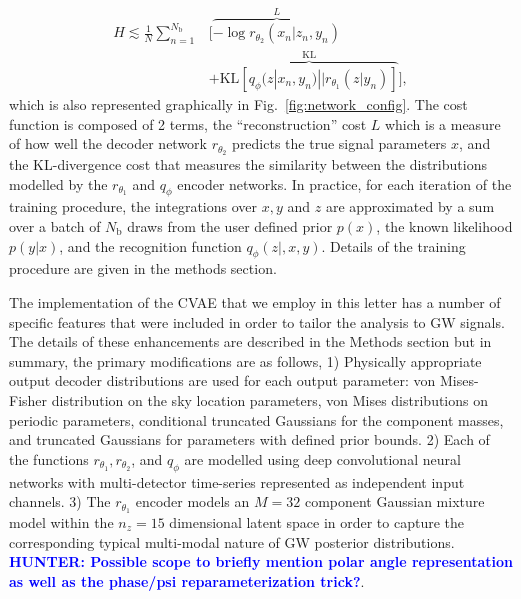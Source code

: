 \documentclass[%
showpacs,
nofootinbib,
 amsmath,amssymb,
 aps,
 twocolumn,
 prl,
 reprint,
floatfix,
]{revtex4-1}
\newcommand{\hunter}[1]{\textbf{\textcolor{blue}{HUNTER: #1}}}
\begin{document}
%
\begin{align}\label{eq:cost3} H \lesssim
\frac{1}{N}\sum_{n=1}^{N_{\text{b}}}&\Big[\overbrace{-\log
r_{\theta_{2}}(x_{n}|z_{n},y_{n})}^{L}\nonumber\\
&+\overbrace{\text{KL}\left[q_{\phi}(z|x_{n},y_{n})||r_{\theta_{1}}(z|y_{n})\right]}^{\text{KL}}\Big],
\end{align}
%
which is also represented graphically in Fig.~\ref{fig:network_config}.
The cost function is composed of 2 terms, the ``reconstruction'' cost $L$ which
is a measure of how well the decoder network $r_{\theta_2}$ predicts the true
signal parameters $x$, and the \ac{KL}-divergence cost that measures the
similarity between the distributions modelled by the $r_{\theta_1}$ and
$q_{\phi}$ encoder networks. In practice, for each iteration of the training
procedure, the integrations over $x,y$ and $z$ are approximated by a sum over a
batch of $N_{\text{b}}$ draws from the user defined prior $p(x)$, the known
likelihood $p(y|x)$, and the recognition function $q_{\phi}(z|,x,y)$. Details
of the training procedure are given in the methods section.  

%
%
The implementation of the \ac{CVAE} that we employ in this letter has a
number of specific features that were included in order to tailor the analysis to
\ac{GW} signals. The details of these enhancements are described in the Methods
section but in summary, the primary modifications are as follows, 1) Physically 
appropriate output decoder distributions are used for each output parameter: 
von Mises-Fisher distribution on the sky location parameters, von Mises 
distributions on periodic parameters, conditional truncated Gaussians for 
the component masses, and truncated Gaussians for
parameters with defined prior bounds. 2) Each of the
functions $r_{\theta_1},r_{\theta_2}$, and $q_{\phi}$ are modelled using deep
convolutional neural networks with multi-detector time-series represented as
independent input channels. 3) The $r_{\theta_1}$ encoder models an $M=32$ component
Gaussian mixture model within the $n_{z}=15$ dimensional latent space in order
to capture the corresponding typical multi-modal nature of \ac{GW} posterior
distributions.  \hunter{Possible scope to briefly mention polar angle representation 
as well as the phase/psi reparameterization trick?}.
\end{document}
